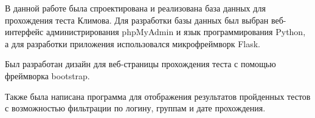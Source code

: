 В данной работе была спроектирована и реализована база данных для прохождения теста Климова. Для разработки базы данных был выбран веб-интерфейс администрирования phpMyAdmin и язык программирования Python, а для разработки приложения использовался микрофреймворк Flask.

Был разработан дизайн для веб-страницы прохождения теста с помощью фреймворка bootstrap.

Также была написана программа для отображения результатов пройденных тестов с возможностью фильтрации по логину, группам и дате прохождения.